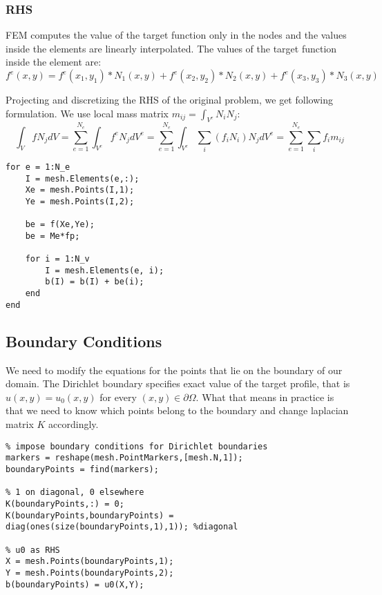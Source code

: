 \documentclass[unicode,11pt,a4paper,oneside,numbers=endperiod,openany]{scrartcl}
\begin{document}
\subsubsection{RHS}
FEM computes the value of the target function only in the nodes and the values inside the elements are linearly interpolated. The values of the target function inside the element are:
\begin{equation}
    f^e(x,y) = f^e(x_1,y_1) * N_1(x,y) + f^e(x_2,y_2) * N_2(x,y) + f^e(x_3,y_3) * N_3(x,y) 
\end{equation}

Projecting and discretizing the RHS of the original problem, we get following formulation. We use local mass matrix $m_{ij} = \int_{V^e} N_i N_j $:
\begin{equation}
    \int_V f N_j dV = \sum_{e=1}^{N_e} \int_{V^e} f^e N_j dV^e = \sum_{e=1}^{N_e} \int_{V^e} \sum_i (f_i N_i) N_j dV^e = \sum_{e=1}^{N_e} \sum_i f_i m_{ij}
\end{equation}

\begin{lstlisting}[caption=Assembly of RHS]
for e = 1:N_e
    I = mesh.Elements(e,:);
    Xe = mesh.Points(I,1);
    Ye = mesh.Points(I,2);

    be = f(Xe,Ye);
    be = Me*fp;

    for i = 1:N_v
        I = mesh.Elements(e, i);
        b(I) = b(I) + be(i);
    end
end
\end{lstlisting}

\subsection{Boundary Conditions}
We need to modify the equations for the points that lie on the boundary of our domain. The Dirichlet boundary specifies exact value of the target profile, that is $u(x,y) = u_0(x,y)$ for every $(x,y) \in \partial\Omega$. What that means in practice is that we need to know which points belong to the boundary and change laplacian matrix $K$ accordingly.
\begin{lstlisting}
% impose boundary conditions for Dirichlet boundaries
markers = reshape(mesh.PointMarkers,[mesh.N,1]);
boundaryPoints = find(markers);

% 1 on diagonal, 0 elsewhere
K(boundaryPoints,:) = 0;
K(boundaryPoints,boundaryPoints) = diag(ones(size(boundaryPoints,1),1)); %diagonal

% u0 as RHS
X = mesh.Points(boundaryPoints,1);
Y = mesh.Points(boundaryPoints,2);
b(boundaryPoints) = u0(X,Y);
\end{lstlisting}
\end{document}
